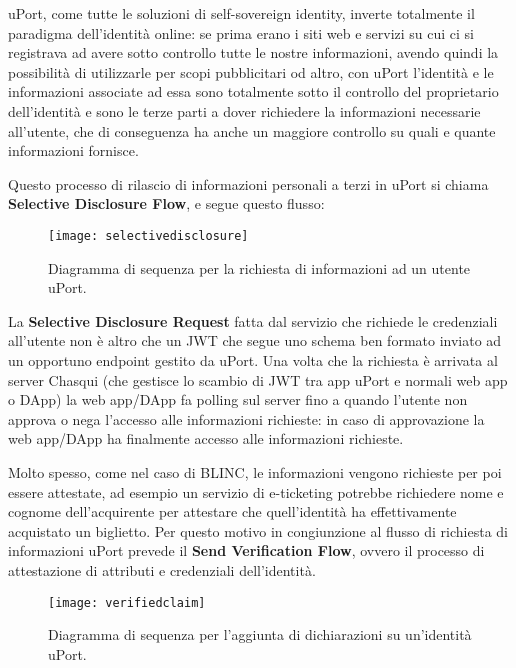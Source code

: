 uPort, come tutte le soluzioni di self-sovereign identity, inverte totalmente
il paradigma dell’identità online:
se prima erano i siti web e servizi su cui ci si registrava ad avere sotto controllo
tutte le nostre informazioni, avendo quindi la possibilità di utilizzarle per scopi pubblicitari od altro,
con uPort l’identità e le informazioni associate ad essa sono totalmente sotto il controllo del
proprietario dell’identità e sono le terze parti a dover richiedere la informazioni necessarie all’utente,
che di conseguenza ha anche un maggiore controllo su quali e quante informazioni fornisce.

Questo processo di rilascio di informazioni personali a terzi in uPort si chiama \textbf{Selective Disclosure Flow}, e segue questo flusso:

\newpage

\begin{figure}[!ht]
    \texttt{[image: selectivedisclosure]}
    \caption{Diagramma di sequenza per la richiesta di informazioni ad un utente uPort.}
    \label{fig:selectivedisclosure}
\end{figure}

La \textbf{Selective Disclosure Request} fatta dal servizio che richiede le credenziali
all’utente non è altro che un JWT che segue uno schema ben formato inviato ad un
opportuno endpoint gestito da uPort. Una volta che la richiesta è arrivata al server
Chasqui (che gestisce lo scambio di JWT tra app uPort e normali web app o DApp)
la web app/DApp fa polling sul server fino a quando l’utente non approva o nega
l’accesso alle informazioni richieste: in caso di approvazione la web app/DApp ha
finalmente accesso alle informazioni richieste.

Molto spesso, come nel caso di BLINC, le informazioni vengono richieste per poi essere
attestate, ad esempio un servizio di e-ticketing potrebbe
richiedere nome e cognome dell’acquirente per attestare che
quell’identità ha effettivamente acquistato un biglietto. Per questo motivo
in congiunzione al flusso di richiesta di informazioni uPort prevede il
\textbf{Send Verification Flow}, ovvero il processo di attestazione di attributi
e credenziali dell’identità.

\newpage

\begin{figure}[!ht]
    \texttt{[image: verifiedclaim]}
    \caption{Diagramma di sequenza per l'aggiunta di dichiarazioni su un'identità uPort.}
    \label{fig:verifiedclaim}
\end{figure}

